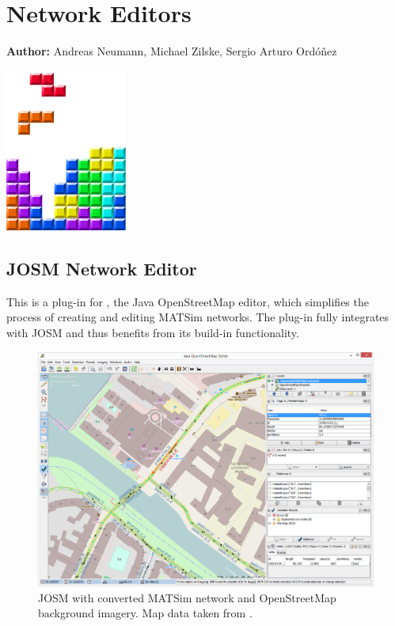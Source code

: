 \chapter{Network Editors }
\label{ch:networkeditor}

\hfill \textbf{Author:} Andreas Neumann, Michael Zilske, Sergio Arturo Ordóñez

\begin{center} \includegraphics[width=0.3\textwidth, angle=0]{figures/MATSimBook.png} \end{center}

\section{JOSM Network Editor}
This is a plug-in for \citet[][]{JOSM2014}, the Java OpenStreetMap editor, which simplifies the process of creating and editing MATSim networks. The plug-in fully integrates with JOSM and thus benefits from its build-in functionality.

\begin{figure}
\centering
\includegraphics[width=0.9\linewidth]{extending/modules/networkeditor/josm_screenshot.png}
\caption{JOSM with converted MATSim network and OpenStreetMap background imagery. Map data taken from \citet[][]{OpenStreetMap2014}.}
\label{fig:networkeditor_screenshot}
\end{figure}

